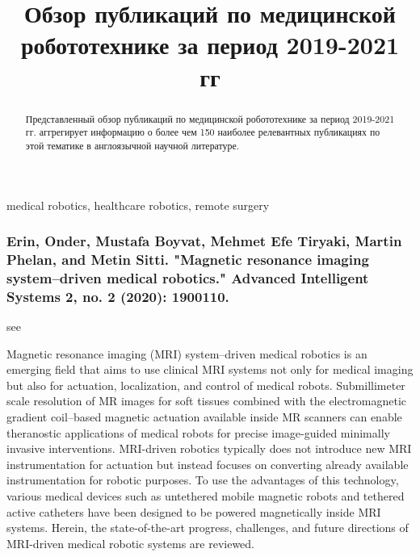 \documentclass[conference]{IEEEtran}
\begin{document}
\title{Обзор публикаций по медицинской робототехнике за период 2019-2021 гг}

\author{
\and
{}
}

\maketitle

\begin{abstract}
Представленный обзор публикаций по медицинской робототехнике за период 2019-2021 гг. аггрегирует информацию о более чем 150 наиболее релевантных публикациях по этой тематике в англоязычной научной литературе.
\end{abstract}

\begin{IEEEkeywords}
medical robotics, healthcare robotics, remote surgery 
\end{IEEEkeywords}

\medskip
\subsubsection{Erin, Onder, Mustafa Boyvat, Mehmet Efe Tiryaki, Martin Phelan, and Metin Sitti. "Magnetic resonance imaging system–driven medical robotics." Advanced Intelligent Systems 2, no. 2 (2020): 1900110.}
see \cite{erin2020magnetic}

Magnetic resonance imaging (MRI) system–driven medical robotics is an emerging field that aims to use clinical MRI systems not only for medical imaging but also for actuation, localization, and control of medical robots. Submillimeter scale resolution of MR images for soft tissues combined with the electromagnetic gradient coil–based magnetic actuation available inside MR scanners can enable theranostic applications of medical robots for precise image-guided minimally invasive interventions. MRI-driven robotics typically does not introduce new MRI instrumentation for actuation but instead focuses on converting already available instrumentation for robotic purposes. To use the advantages of this technology, various medical devices such as untethered mobile magnetic robots and tethered active catheters have been designed to be powered magnetically inside MRI systems. Herein, the state-of-the-art progress, challenges, and future directions of MRI-driven medical robotic systems are reviewed.
\end{document}
